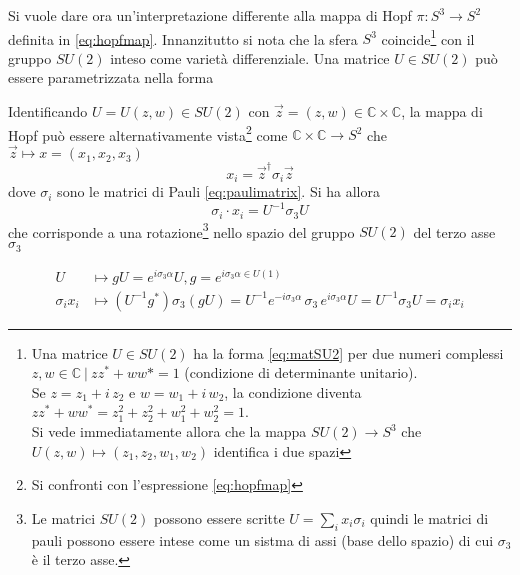 Si vuole dare ora un'interpretazione differente alla mappa di Hopf $\pi : S^3 \to S^2$
definita in \ref{eq:hopfmap}. Innanzitutto si nota che la sfera $S^3$
coincide\footnote{
   Una matrice $U \in SU(2)$ ha la forma \ref{eq:matSU2} per due numeri complessi
   $z,w \in \mathbb{C} \: | \: zz^* + ww* = 1$ (condizione di determinante unitario).\\
   Se $z = z_1 + i \, z_2$ e $w = w_1 + i \, w_2$, la condizione diventa
   $zz^* + ww^* = z_1^2 + z_2^2 + w_1^2 + w_2^2 = 1$. \\
   Si vede immediatamente allora che la mappa $SU(2) \to S^3$ che
   $U(z,w) \mapsto (z_1,z_2,w_1,w_2)$ identifica i due spazi
}
con il gruppo $SU(2)$ inteso come varietà differenziale. Una matrice $U \in SU(2)$
può essere parametrizzata nella forma

Identificando $U = U(z,w) \in SU(2)$ con $\vec z = (z,w) \in \mathbb{C} \times \mathbb{C}$,
la mappa di Hopf può essere alternativamente vista\footnote{
   Si confronti con l'espressione \ref{eq:hopfmap}
}
come $\mathbb{C} \times \mathbb{C} \to S^2$ che $\vec z \mapsto x = (x_1,x_2,x_3)$
$$
   x_i = \vec z ^\dagger \sigma_i \vec z
$$
dove $\sigma_i$ sono le matrici di Pauli \ref{eq:paulimatrix}. Si ha allora
\begin{equation}\label{eq:hopfmap2}
   \sigma_i \cdot x_i = U^{-1} \sigma_3 U
\end{equation}
che corrisponde a una rotazione\footnote{
   Le matrici $SU(2)$ possono essere scritte $U = \sum_i x_i \sigma_i$ quindi le
   matrici di pauli possono essere intese come un sistma di assi (base dello spazio)
   di cui $\sigma_3$ è il terzo asse.
} nello spazio del gruppo $SU(2)$ del terzo asse $\sigma_3$

\begin{equation}
   \begin{aligned}
      U & \mapsto gU = e^{i \sigma_3 \alpha} U ,  g = e^{i\sigma_3 \alpha \in U(1)} \\
      \sigma_i x_i & \mapsto
         (U^{-1} g^*) \sigma_3 (g U)
         = U^{-1}e^{-i \sigma_3 \alpha}\, \sigma_3 \, e^{i \sigma_3 \alpha}U
         = U^{-1}\sigma_3 U =\sigma_i x_i
   \end{aligned}
\end{equation}
